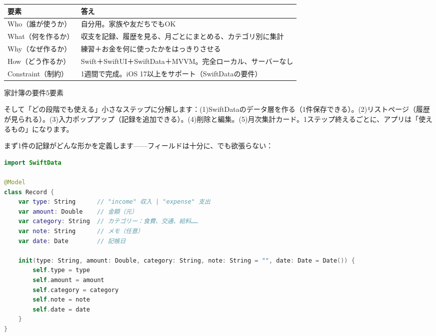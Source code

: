 


\begin{center}
\begin{tabularx}{\linewidth}{|X|X|}
\hline
\textbf{要素} & \textbf{答え} \tabularnewline
\hline
Who（誰が使うか） & 自分用。家族や友だちでもOK \tabularnewline
What（何を作るか） & 収支を記録、履歴を見る、月ごとにまとめる、カテゴリ別に集計 \tabularnewline
Why（なぜ作るか） & 練習＋お金を何に使ったかをはっきりさせる \tabularnewline
How（どう作るか） & Swift＋SwiftUI＋SwiftData＋MVVM。完全ローカル、サーバーなし \tabularnewline
Constraint（制約） & 1週間で完成。iOS 17以上をサポート（SwiftDataの要件） \tabularnewline
\hline
\end{tabularx}
\end{center}

\begin{center}\small\color{gray}家計簿の要件5要素\end{center}

そして「どの段階でも使える」小さなステップに分解します：(1)SwiftDataのデータ層を作る（1件保存できる）。(2)リストページ（履歴が見られる）。(3)入力ポップアップ（記録を追加できる）。(4)削除と編集。(5)月次集計カード。1ステップ終えるごとに、アプリは「使えるもの」になります。


まず1件の記録がどんな形かを定義します——フィールドは十分に、でも欲張らない：

\begin{lstlisting}[language=Swift]
import SwiftData

@Model
class Record {
    var type: String      // "income" 収入 | "expense" 支出
    var amount: Double    // 金額（元）
    var category: String  // カテゴリー：食費、交通、給料……
    var note: String      // メモ（任意）
    var date: Date        // 記帳日

    init(type: String, amount: Double, category: String, note: String = "", date: Date = Date()) {
        self.type = type
        self.amount = amount
        self.category = category
        self.note = note
        self.date = date
    }
}
\end{lstlisting}

